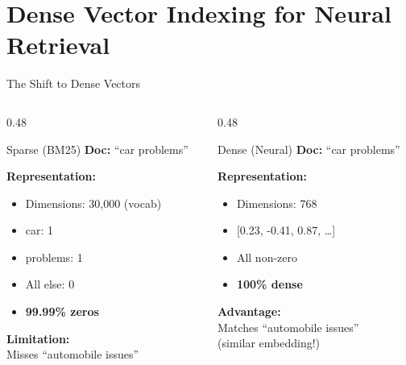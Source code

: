 \documentclass[aspectratio=169]{beamer}
\begin{document}
\section{Dense Vector Indexing for Neural Retrieval}

\begin{frame}[shrink=10]{The Shift to Dense Vectors}
\begin{columns}
\begin{column}{0.48\textwidth}
\begin{block}{Sparse (BM25)}
\textbf{Doc:} ``car problems''

\vspace{0.5em}

\textbf{Representation:}
\begin{itemize}
    \item Dimensions: 30,000 (vocab)
    \item car: 1
    \item problems: 1
    \item All else: 0
    \item \textbf{99.99\% zeros}
\end{itemize}

\vspace{0.5em}

\textbf{Limitation:} \\
Misses ``automobile issues''
\end{block}
\end{column}

\begin{column}{0.48\textwidth}
\begin{block}{Dense (Neural)}
\textbf{Doc:} ``car problems''

\vspace{0.5em}

\textbf{Representation:}
\begin{itemize}
    \item Dimensions: 768
    \item {[0.23, -0.41, 0.87, \dots]}
    \item All non-zero
    \item \textbf{100\% dense}
\end{itemize}

\vspace{0.5em}

\textbf{Advantage:} \\
Matches ``automobile issues'' \\
(similar embedding!)
\end{block}
\end{column}
\end{columns}


\end{frame}
\end{document}
